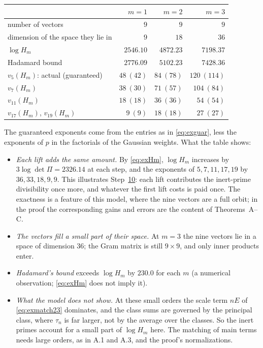 \documentclass[11pt]{amsart}
\numberwithin{equation}{section}
\theoremstyle{definition}
\theoremstyle{remark}
\begin{document}
\begin{center}\small
\begin{tabular}{@{}lrrr@{}}
\toprule
 & $m=1$ & $m=2$ & $m=3$\\
\midrule
number of vectors & $9$ & $9$ & $9$\\
dimension of the space they lie in & $9$ & $18$ & $36$\\
$\log H_m$ & $2546.10$ & $4872.23$ & $7198.37$\\
Hadamard bound & $2776.09$ & $5102.23$ & $7428.36$\\
$v_5(H_m)$: actual (guaranteed) & $48\ (42)$ & $84\ (78)$ & $120\ (114)$\\
$v_7(H_m)$ & $38\ (30)$ & $71\ (57)$ & $104\ (84)$\\
$v_{11}(H_m)$ & $18\ (18)$ & $36\ (36)$ & $54\ (54)$\\
$v_{17}(H_m)$, $v_{19}(H_m)$ & $9\ (9)$ & $18\ (18)$ & $27\ (27)$\\
\bottomrule
\end{tabular}
\end{center}
The guaranteed exponents come from the entries as in \eqref{eq:exguar}, less the exponents of $p$ in the factorials of the Gaussian weights. What the table shows:
\begin{itemize}[leftmargin=2em]
\item \emph{Each lift adds the same amount.} By \eqref{eq:exHm}, $\log H_m$ increases by $3\log\det\Pi=2326.14$ at each step, and the exponents of $5,7,11,17,19$ by $36,33,18,9,9$. This illustrates Step~\hyperref[step:10]{10}: each lift contributes the inert-prime divisibility once more, and whatever the first lift costs is paid once. The exactness is a feature of this model, where the nine vectors are a full orbit; in the proof the corresponding gains and errors are the content of Theorems~A--C.
\item \emph{The vectors fill a small part of their space.} At $m=3$ the nine vectors lie in a space of dimension $36$; the Gram matrix is still $9\times9$, and only inner products enter.
\item \emph{Hadamard's bound} exceeds $\log H_m$ by $230.0$ for each $m$ (a numerical observation; \eqref{eq:exHm} does not imply it).
\item \emph{What the model does not show.} At these small orders the scale term $nE$ of \eqref{eq:exmatch23} dominates, and the class sums are governed by the principal class, where $\tau_n$ is far larger, not by the average over the classes. So the inert primes account for a small part of $\log H_m$ here. The matching of main terms needs large orders, as in A.1 and A.3, and the proof's normalizations.
\end{itemize}
\end{document}
